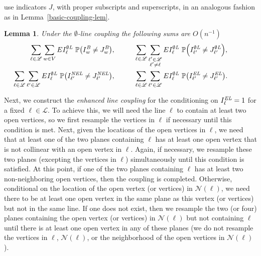 \documentclass{amsart}
\newcommand{\vect}[1]{{ #1}}
\newcommand{\prob}{\mathbb{P}}
\newcommand{\B}{I^{\text{\em B}}}
\newcommand{\OL}{I^{\emptyset\text{\em L}}}
\newcommand{\EL}{I^{\text{\em EL}}}
\newcommand{\NEL}{I^{\text{\em NEL}}}
\newcommand{\JB}{J^{\text{\em B}}}
\newcommand{\JOL}{J^{\emptyset\text{\em L}}}
\newcommand{\JEL}{J^{\text{\em EL}}}
\newcommand{\JNEL}{J^{\text{\em NEL}}}
\numberwithin{equation}{section}
\newcommand{\lineset}{\mathscr{L}}
\newcommand{\Ln}{\ell}
\newtheorem{lemma}[theorem]{Lemma}
\theoremstyle{definition}
\theoremstyle{remark}
\begin{document}
use indicators $J$, with proper subscripts and superscripts, in an analogous fashion as in Lemma~\ref{basic-coupling-lem}.
\begin{lemma}
\label{ol-coupling-lem}
Under the $\emptyset$-line coupling the following sums are $O(n^{-1})$
\begin{align*}
\sum_{\Ln \in \lineset} \sum_{\vect{w}\in V} E\OL_\Ln\ \prob{\left(\B_{\vect{w}} \neq \JB_{\vect{w}}\right)}, & \hspace{1cm} 
\sum_{\Ln \in \lineset} \sum_{\substack{\Ln' \in \lineset\\ \Ln'\neq \Ln}} E\OL_\Ln\ \prob{\left(\OL_{\Ln'} \neq \JOL_{\Ln'}\right)},
\hspace{1cm}  \\
\sum_{\Ln \in \lineset} \sum_{\Ln' \in \lineset} E\OL_\Ln\ \prob{\left(\NEL_{\Ln'}\neq \JNEL_{\Ln'}\right)}, &\hspace{1cm} 
\sum_{\Ln \in \lineset} \sum_{\Ln' \in \lineset} E\OL_\Ln\ \prob{\left(\EL_{\Ln'} \neq \JEL_{\Ln'}\right)} .
\end{align*}
\end{lemma}

Next, we construct the {\em enhanced line coupling} for the conditioning on $\EL_\Ln = 1$ for a fixed $\Ln \in \lineset$.  To achieve this, we will need the line $\Ln$ to contain at least two open vertices, so we first resample the vertices in $\Ln$ if necessary until this condition is met.  Next, given the locations of the open vertices in $\Ln$, we need that at least one of the two planes containing $\Ln$ has at least one open vertex that is not collinear with an open vertex in $\Ln$.  Again, if necessary, we resample these two planes (excepting the vertices in $\Ln$) simultaneously until this condition is satisfied.  At this point, if one of the two planes containing $\Ln$ has at least  two non-neighboring open vertices, then the coupling is completed.  Otherwise, conditional on the location of the open vertex (or vertices) in $\mathcal{N}(\Ln)$, we need there to be at least one open vertex in the same plane as this vertex (or vertices) but not in the same line.  If one does not exist, then we resample the two (or four) planes containing the open vertex (or vertices) in $\mathcal{N}(\Ln)$ but not containing $\Ln$ until there is at least one open vertex in any of these planes (we do not resample the vertices in $\Ln$, $\mathcal{N}(\Ln)$, or the neighborhood of the open vertices in $\mathcal{N}(\Ln)$).
\end{document}
